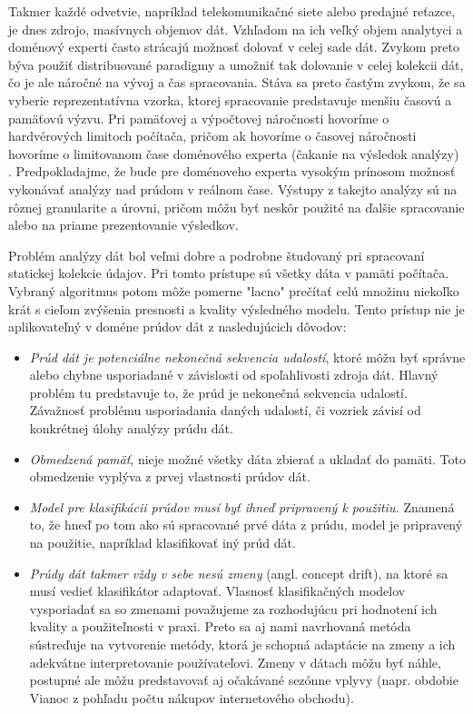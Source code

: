 Takmer každé odvetvie, napríklad telekomunikačné siete alebo predajné reťazce, je dnes zdrojo, masívnych objemov dát. Vzhľadom na ich veľký objem analytyci a doménový experti často strácajú možnosť dolovať v celej sade dát. Zvykom preto býva použiť distribuované paradigmy a umožniť tak dolovanie v celej kolekcii dát, čo je ale náročné na vývoj a čas spracovania. Stáva sa preto častým zvykom, že sa vyberie reprezentatívna vzorka, ktorej spracovanie predstavuje menšiu časovú a pamäťovú výzvu. Pri pamäťovej a výpočtovej náročnosti hovoríme o hardvérových limitoch počítača, pričom ak hovoríme o časovej náročnosti hovoríme o limitovanom čase doménového experta (čakanie na výsledok analýzy) \citep{hulten2001mining}. Predpokladajme, že bude pre doménoveho experta vysokým prínosom možnosť vykonávať analýzy nad prúdom v reálnom čase. Výstupy z takejto analýzy sú na rôznej granularite a úrovni, pričom môžu byť neskôr použité na ďalšie spracovanie alebo na priame prezentovanie výsledkov.
\par
Problém analýzy dát bol veľmi dobre a podrobne študovaný pri spracovaní statickej kolekcie údajov. Pri tomto prístupe sú všetky dáta v pamäti počítača. Vybraný algoritmus potom môže pomerne "lacno" prečítať celú množinu niekoľko krát s cieľom zvýšenia presnosti a kvality výsledného modelu. Tento prístup nie je aplikovateľný v doméne prúdov dát z nasledujúcich dôvodov:
\begin{itemize}
	\item \textit{Prúd dát je potenciálne nekonečná sekvencia udalostí}, ktoré môžu byť správne alebo chybne usporiadané v závislosti od spoľahlivosti zdroja dát. Hlavný problém tu predstavuje to, že prúd je nekonečná sekvencia udalostí. Závažnosť problému usporiadania daných udalostí, či vozriek závisí od konkrétnej úlohy analýzy prúdu dát.
	\item \textit{Obmedzená pamäť}, nieje možné všetky dáta zbierať a ukladať do pamäti. Toto obmedzenie vyplýva z prvej vlastnosti prúdov dát.
	\item \textit{Model pre klasifikácii prúdov musí byť ihneď pripravený k použitiu.} Znamená to, že hneď po tom ako sú spracované prvé dáta z prúdu, model je pripravený na použitie, napríklad klasifikovať iný prúd dát.
	\item \textit{Prúdy dát takmer vždy v sebe nesú zmeny} (angl. concept drift), na ktoré sa musí vedieť klasifikátor adaptovať. Vlasnosť klasifikačných modelov vysporiadať sa so zmenami považujeme za rozhodujúcu pri hodnotení ich kvality a použiteľnosti v praxi. Preto sa aj nami navrhovaná metóda sústreďuje na vytvorenie metódy, ktorá je schopná adaptácie na zmeny a ich adekvátne interpretovanie používateľovi. Zmeny v dátach môžu byť náhle, postupné ale môžu predstavovať aj očakávané sezónne vplyvy (napr. obdobie Vianoc z pohľadu počtu nákupov internetového obchodu).
\end{itemize}

